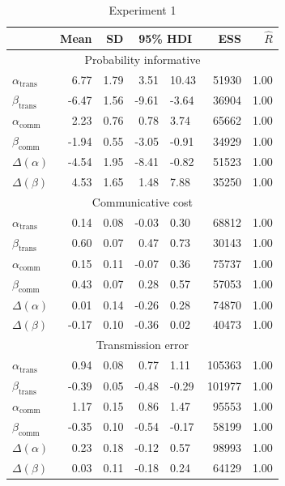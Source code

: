 \documentclass[doc,biblatex]{apa7}
\begin{document}
\begin{table}[h]
\begin{center}
\begin{threeparttable}
\caption{Experiment 1}
\footnotesize
\begin{tabular}{lrrrlrr}
\toprule
 & Mean & SD & \multicolumn{2}{c}{95\% HDI} & ESS & $\hat{R}$ \\
\midrule
\multicolumn{7}{c}{Probability informative} \\
$\alpha_\mathrm{trans}$ & 6.77 & 1.79 & 3.51 & 10.43 & 51930 & 1.00 \\
$\beta_\mathrm{trans}$ & -6.47 & 1.56 & -9.61 & -3.64 & 36904 & 1.00 \\
$\alpha_\mathrm{comm}$ & 2.23 & 0.76 & 0.78 & 3.74 & 65662 & 1.00 \\
$\beta_\mathrm{comm}$ & -1.94 & 0.55 & -3.05 & -0.91 & 34929 & 1.00 \\
$\Delta(\alpha)$ & -4.54 & 1.95 & -8.41 & -0.82 & 51523 & 1.00 \\
$\Delta(\beta)$ & 4.53 & 1.65 & 1.48 & 7.88 & 35250 & 1.00 \\
\midrule
\multicolumn{7}{c}{Communicative cost} \\
$\alpha_\mathrm{trans}$ & 0.14 & 0.08 & -0.03 & 0.30 & 68812 & 1.00 \\
$\beta_\mathrm{trans}$ & 0.60 & 0.07 & 0.47 & 0.73 & 30143 & 1.00 \\
$\alpha_\mathrm{comm}$ & 0.15 & 0.11 & -0.07 & 0.36 & 75737 & 1.00 \\
$\beta_\mathrm{comm}$ & 0.43 & 0.07 & 0.28 & 0.57 & 57053 & 1.00 \\
$\Delta(\alpha)$ & 0.01 & 0.14 & -0.26 & 0.28 & 74870 & 1.00 \\
$\Delta(\beta)$ & -0.17 & 0.10 & -0.36 & 0.02 & 40473 & 1.00 \\
\midrule
\multicolumn{7}{c}{Transmission error} \\
$\alpha_\mathrm{trans}$ & 0.94 & 0.08 & 0.77 & 1.11 & 105363 & 1.00 \\
$\beta_\mathrm{trans}$ & -0.39 & 0.05 & -0.48 & -0.29 & 101977 & 1.00 \\
$\alpha_\mathrm{comm}$ & 1.17 & 0.15 & 0.86 & 1.47 & 95553 & 1.00 \\
$\beta_\mathrm{comm}$ & -0.35 & 0.10 & -0.54 & -0.17 & 58199 & 1.00 \\
$\Delta(\alpha)$ & 0.23 & 0.18 & -0.12 & 0.57 & 98993 & 1.00 \\
$\Delta(\beta)$ & 0.03 & 0.11 & -0.18 & 0.24 & 64129 & 1.00 \\
\bottomrule
\end{tabular}
\label{exp1_parameter_estimates}
\end{threeparttable}
\end{center}
\end{table}
\end{document}
